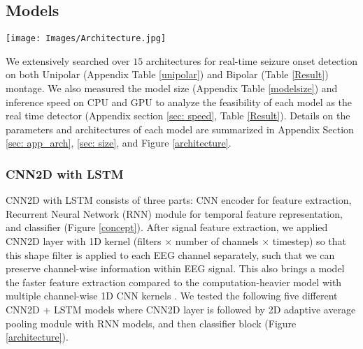\documentclass[pmlr,twocolumn,10pt]{jmlr}
\begin{document}
\subsection{Models}
\label{sec:method_model}
\begin{figure*}[h!]
	\centering
	\texttt{[image: Images/Architecture.jpg]}
    \caption{\small \textbf{Architecture of CNN2D + LSTM seizure detector} with raw EEG input. K: Kernel size, S: Stride}
	\label{architecture}
\end{figure*} We extensively searched over $15$ architectures for real-time seizure onset detection on both Unipolar (Appendix Table \ref{unipolar}) and Bipolar (Table \ref{Result}) montage. We also measured the model size (Appendix Table \ref{modelsize}) and inference speed on CPU and GPU to analyze the feasibility of each model as the real time detector (Appendix section \ref{sec: speed}, Table \ref{Result}).
Details on the parameters and architectures of each model are summarized in Appendix Section \ref{sec: app_arch}, \ref{sec: size}, and Figure \ref{architecture}.

\subsubsection{CNN2D with LSTM}
\label{sec:CNN2DLSTM}
CNN2D with LSTM consists of three parts: CNN encoder for feature extraction, Recurrent Neural Network (RNN) module for temporal feature representation, and classifier (Figure \ref{concept}). After signal feature extraction, we applied CNN2D layer with 1D kernel (filters $\times$ number of channels $\times$ timestep) so that this shape filter is applied to each EEG channel separately, such that we can preserve channel-wise information within EEG signal. This also brings a model the faster feature extraction compared to the computation-heavier model with multiple channel-wise 1D CNN kernels \citep{priyasad2021interpretable, mohsenvand2020contrastive}. We tested the following five different CNN2D + LSTM models where CNN2D layer is followed by 2D adaptive average pooling module with RNN models, and then classifier block (Figure \ref{architecture}).
 
\end{document}
